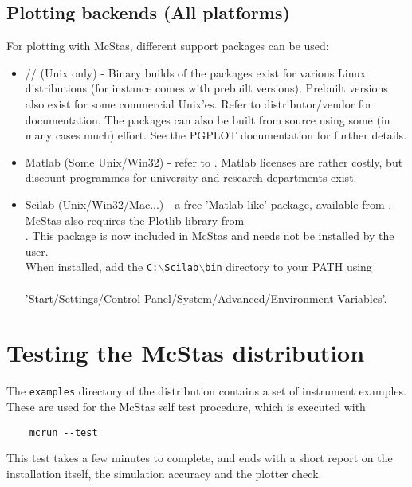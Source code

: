 \subsection{Plotting backends (All platforms)}
\label{s:plotting}
For plotting with McStas, different support packages can be used:
\begin{itemize}
\item{// (Unix only) - Binary builds of the packages
    exist for various Linux distributions (for instance
     comes with
    prebuilt versions). Prebuilt versions also exist for some commercial Unix'es. 
    Refer to distributor/vendor for documentation. The packages can also be
    built from source using some (in many cases much) effort.  See the
    PGPLOT documentation for further details.}
\item{Matlab (Some Unix/Win32) - refer to
    . Matlab licenses are rather costly, but discount programmes for university and research departments exist.}
\item{Scilab (Unix/Win32/Mac...) - a free 'Matlab-like' package, available from
    . McStas also requires the Plotlib library from \\ . This package is now included in McStas and needs not be installed by the user.
    \\
When installed, add the \texttt{C:$\backslash$Scilab$\backslash$bin} directory to your PATH
using\\\ \\
'Start/Settings/Control Panel/System/Advanced/Environment Variables'.}
\end{itemize}

\section{Testing the McStas distribution}
\label{s:testing}

The \verb+examples+ directory of the distribution contains a set of instrument examples. These are used for the McStas self test procedure, which is executed with
\begin{verbatim}
    mcrun --test
\end{verbatim}
This test takes a few minutes to complete, and ends with a short report on the installation itself, the simulation accuracy and the plotter check. 
